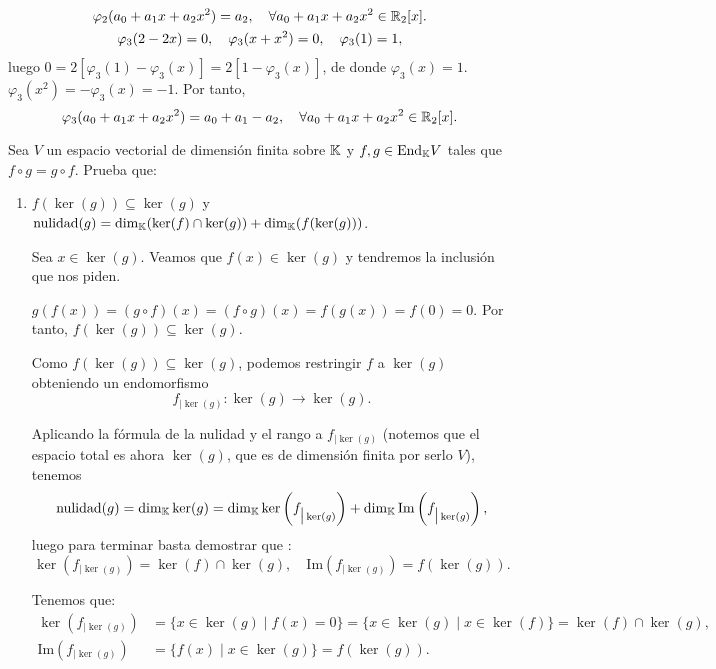 \documentclass[12pt]{article}
\begin{document}
\begin{ejercicio}[2.5 puntos]
\begin{enumerate}
			\begin{gather*}
				\varphi_2(a_0 + a_1 x + a_2 x^2) = a_2, \quad \forall a_0 + a_1 x + a_2 x^2 \in {\mathbb{R}}_2[x].\\
				\varphi_3(2 - 2x) = 0, \quad \varphi_3(x + x^2) = 0, \quad \varphi_3(1) = 1,
			\end{gather*}
			luego $ 0 = 2[\varphi_3(1) - \varphi_3(x)] = 2[1 - \varphi_3(x)]$, de donde $\varphi_3(x) = 1$. $\varphi_3(x^2) = -\varphi_3(x) = -1.$ Por tanto,
			$$
			\varphi_3(a_0 + a_1 x + a_2 x^2) = a_0 + a_1 - a_2, \quad \forall a_0 + a_1 x + a_2 x^2 \in {\mathbb{R}}_2[x].
			$$
		\end{enumerate}
	\end{ejercicio}	
	
	\begin{ejercicio}[2.5 puntos] Sea $V$ un espacio vectorial de dimensión finita sobre ${\mathbb{K}}$ y $f,g \in \text{End}_{{\mathbb{K}}}V$ tales que $f \circ g = g \circ f$. Prueba que:
			
			\begin{enumerate} 
				\item $f( \ker(g)) \subseteq  \ker(g)$ y $\text{nulidad}(g) = \dim_{{\mathbb{K}}}( \ker(f) \cap  \ker(g)) + \dim_{{\mathbb{K}}}(f( \ker(g)))$.
				
				Sea $x \in \ker(g)$. Veamos que $f(x) \in \ker(g)$ y tendremos la inclusión que nos piden. 
				
				$g(f(x)) = (g \circ f)(x) = (f \circ g)(x) = f(g(x)) = f(0) = 0$. Por tanto, $f(\ker(g)) \subseteq \ker(g)$. 
				
				Como $f(\ker(g)) \subseteq \ker(g)$, podemos restringir $f$ a $\ker(g)$ obteniendo un endomorfismo 
				$$f_{\big| \ker(g)} : \ker(g) \to \ker(g).$$ 
				
				Aplicando la fórmula de la nulidad y el rango a $f_{\big| \ker(g)}$ (notemos que el espacio total es ahora $\ker(g)$, que es de dimensión finita por serlo $V$), tenemos
				$$ \text{nulidad}(g) = \dim_{{\mathbb{K}}} \ker(g) = \dim_{{\mathbb{K}}} \ker\left(f_{\big| \ker(g)}\right) + \dim_{{\mathbb{K}}} \text{Im}\left(f_{\big| \ker(g)}\right), $$ 
				luego para terminar basta demostrar que :
				$$ \ker\left(f_{\big| \ker(g)}\right) = \ker(f) \cap \ker(g), \quad \text{Im}\left(f_{\big| \ker(g)}\right) = f(\ker(g)). $$

				Tenemos que:
				\begin{align*}
					\ker\left(f_{\big| \ker(g)}\right) &= \{ x \in \ker(g) \mid f(x) = 0 \} = \{ x \in \ker(g) \mid x \in \ker(f) \} = \ker(f) \cap \ker(g),\\
					\text{Im}\left(f_{\big| \ker(g)}\right) &= \{ f(x) \mid x \in \ker(g) \} = f(\ker(g)).
				\end{align*}



\end{enumerate}
\end{ejercicio}
\end{document}
